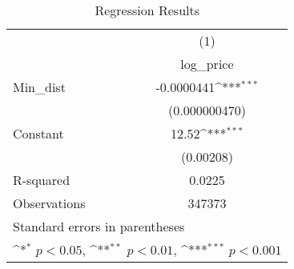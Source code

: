 {
\def\sym#1{\ifmmode^{#1}\else\(^{#1}\)\fi}
\begin{longtable}{l*{1}{c}}
\caption{Regression Results}\\
\toprule\endfirsthead\midrule\endhead\midrule\endfoot\endlastfoot
                    &\multicolumn{1}{c}{(1)}\\
                    &\multicolumn{1}{c}{log\_price}\\
\midrule
Min\_dist            &  -0.0000441\sym{***}\\
                    &(0.000000470)         \\
\addlinespace
Constant            &       12.52\sym{***}\\
                    &   (0.00208)         \\
\midrule
R-squared           &      0.0225         \\
Observations        &      347373         \\
\bottomrule
\multicolumn{2}{l}{\footnotesize Standard errors in parentheses}\\
\multicolumn{2}{l}{\footnotesize \sym{*} \(p<0.05\), \sym{**} \(p<0.01\), \sym{***} \(p<0.001\)}\\
\end{longtable}
}
